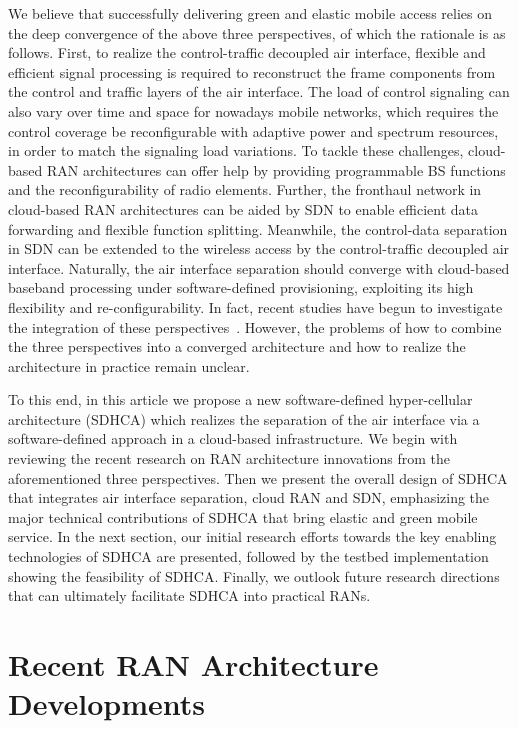 \documentclass[12pt, draftclsnofoot,onecolumn]{IEEEtran}
\begin{document}
We believe that successfully delivering green and elastic mobile access relies
on the deep convergence of the above three perspectives, of which the rationale is as follows. First, to realize the
control-traffic decoupled air interface,
flexible and efficient signal processing is required to reconstruct the frame
components from the control and traffic layers of the air interface.
The load of control signaling can also vary over time and space for nowadays mobile networks,
which requires the control coverage be reconfigurable with adaptive power and spectrum resources, in order to match the signaling load variations.
To tackle these challenges, cloud-based RAN architectures can offer help by providing
programmable BS functions and the reconfigurability of radio elements. Further,
the fronthaul network in cloud-based RAN architectures can be aided by SDN to
enable efficient data forwarding and flexible function splitting.
Meanwhile,
the control-data separation in SDN can be extended to the wireless access by
the control-traffic decoupled air interface.
Naturally, the air interface separation should converge with
cloud-based baseband processing under software-defined provisioning, exploiting its high flexibility and re-configurability. In fact, recent studies have begun to investigate
the integration of these perspectives~\cite{liu2014concert,zaidi2015future}.
However, the problems of how to combine the three
perspectives into a converged architecture and how to realize the architecture
in practice remain unclear.

To this end, in this article we propose a new software-defined
hyper-cellular architecture (SDHCA) which realizes the separation of the air
interface via a software-defined approach in a cloud-based infrastructure. We begin with reviewing the recent research on RAN architecture innovations from the
aforementioned three perspectives. Then we present the overall design of SDHCA that integrates air interface separation, cloud RAN and SDN, emphasizing the major technical contributions of SDHCA that bring elastic and green mobile service. In the next section, our initial research efforts towards the key enabling technologies of SDHCA are presented, followed by the testbed implementation showing the feasibility of SDHCA. Finally, we outlook future
research directions that can ultimately facilitate SDHCA into practical RANs.

\section{Recent RAN Architecture Developments}
\label{sec:review}
\end{document}
